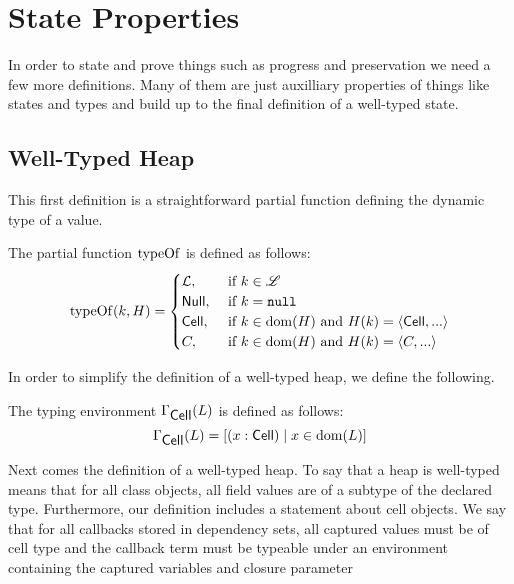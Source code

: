 \section{State Properties}
\label{sec:properties}

In order to state and prove things such as progress and preservation we need a few more
definitions. Many of them are just auxilliary properties of things like states
and types and build up to the final definition of a well-typed state.

\subsection{Well-Typed Heap}%
\label{sub:well_typed_heap}

This first definition is a straightforward partial function defining the dynamic
type of a value.
\begin{definition}
  The partial function $\mbox{$\mathrm{typeOf}$}$ is defined as follows:
  \begin{equation}
    \mbox{$\mathrm{typeOf}$}{(k, H)} =
    \begin{cases}
      \mbox{$\mathcal{L}$}, &\text{ if }k \in \mbox{$\mathscr{L}$} \\
      \mbox{$\mathsf{Null}$}, &\text{ if }k = \mbox{\mdseries\texttt{null}} \\
      \mbox{$\mathsf{Cell}$}, &\text{ if }k \in \mbox{$\mathrm{dom}$}{(H)}\text{ and } H(k) = \mbox{$\langle \mbox{$\mathsf{Cell}$}{}, ... \rangle$} \\
      C, &\text{ if }k \in \mbox{$\mathrm{dom}$}{(H)}\text{ and } H(k) = \mbox{$\langle C, ... \rangle$} \\
    \end{cases}
  \end{equation}
\end{definition}
In order to simplify the definition of a well-typed heap, we define the
following.
\begin{definition}
  The typing environment $\Gamma_{\mbox{$\mathsf{Cell}$}}(L)$ is defined as follows:
  \begin{equation}
    \Gamma_{\mbox{$\mathsf{Cell}$}}(L) = \left[(x: \mbox{$\mathsf{Cell}$}) \mid x \in \mbox{$\mathrm{dom}$}(L)\right]
  \end{equation}
\end{definition}
Next comes the definition of a well-typed heap. To say that a heap is
well-typed means that for all class objects, all field values are of
a subtype of the declared type. Furthermore, our definition includes a statement
about cell objects. We say that for all callbacks stored in dependency sets, all
captured values must be of cell type and the callback term must be typeable
under an environment containing the captured variables and closure parameter
